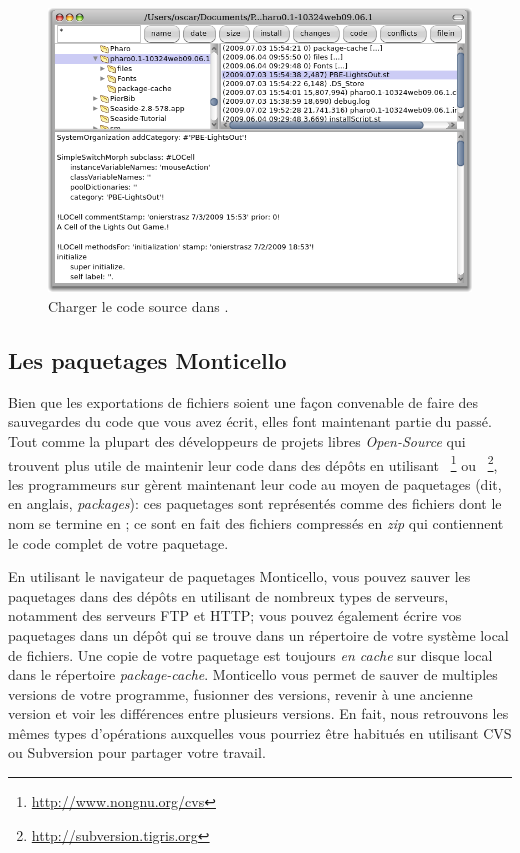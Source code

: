 \documentclass[a4paper,10pt,twoside]{book}
\begin{document}
\begin{figure}[ht]
\centerline {\includegraphics[width=\textwidth]{FileIn}}
\caption{Charger le code source dans \pharo.
}
\end{figure}

\subsection{Les paquetages Monticello}
Bien que les exportations de fichiers soient une façon convenable de
faire des sauvegardes du code que vous avez écrit, elles font
maintenant partie du passé.
Tout comme la plupart des développeurs de projets libres
\emph{Open-Source} qui trouvent plus utile de maintenir leur code dans
des dépôts en utilisant ~\footnote{\url{http://www.nongnu.org/cvs}}
ou ~\footnote{\url{http://subversion.tigris.org}}, les
programmeurs sur \pharo gèrent maintenant leur code au moyen de
paquetages  (dit, en anglais, \emph{packages}): 
ces paquetages sont représentés comme des fichiers dont le nom se
termine en ; ce sont en fait des fichiers compressés en
\emph{zip} qui contiennent le code complet de votre paquetage.

En utilisant le navigateur de paquetages Monticello, vous pouvez sauver les paquetages dans des dépôts en utilisant de nombreux types de serveurs, notamment des serveurs FTP et HTTP; vous pouvez également écrire vos paquetages dans un dépôt qui se trouve dans un répertoire de votre système local de fichiers.
Une copie de votre paquetage est toujours \emph{en cache} sur disque local dans le répertoire \emph{package-cache}. 
Monticello vous permet de sauver de multiples versions de votre programme, fusionner des versions, revenir à une ancienne version et voir les différences entre plusieurs versions.
En fait, nous retrouvons les m\^emes types d'opérations auxquelles vous
pourriez \^etre habitués en utilisant CVS ou Subversion pour
partager votre travail.
\end{document}
